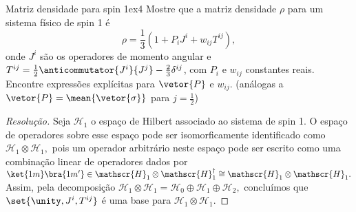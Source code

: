 \begin{exercício}{Matriz densidade para spin 1}{ex4}
    Mostre que a matriz densidade \(\rho\) para um sistema físico de spin 1 é
    \begin{equation*}
        \rho = \frac13 \left(1 + P_iJ^i  + w_{ij} T^{ij}\right),
    \end{equation*}
    onde \(J^i\) são os operadores de momento angular e \(T^{ij} = \frac12\anticommutator{J^i}{J^j} - \frac23 \delta^{ij}\), com \(P_i\) e \(w_{ij}\) constantes reais. Encontre expressões explícitas para \(\vetor{P}\) e \(w_{ij}\). (análogas a \(\vetor{P} = \mean{\vetor{\sigma}}\) para \(j = \frac12\))
\end{exercício}
\begin{proof}[Resolução]
    Seja \(\mathscr{H}_1\) o espaço de Hilbert associado ao sistema de spin 1. O espaço de operadores sobre esse espaço pode ser isomorficamente identificado como \(\mathscr{H}_1 \otimes \mathscr{H}_1,\) pois um operador arbitrário neste espaço pode ser escrito como uma combinação linear de operadores dados por \(\ket{1m}\bra{1m'} \in \mathscr{H}_1 \otimes \mathscr{H}_1^\dag \cong \mathscr{H}_1 \otimes \mathscr{H}_1.\) Assim, pela decomposição \(\mathscr{H}_1 \otimes \mathscr{H}_1 = \mathscr{H}_0 \oplus \mathscr{H}_1 \oplus \mathscr{H}_2,\) concluímos que \(\set{\unity, J^i, T^{ij}}\) é uma base para \(\mathscr{H}_1 \otimes \mathscr{H}_1.\)



\end{proof}
